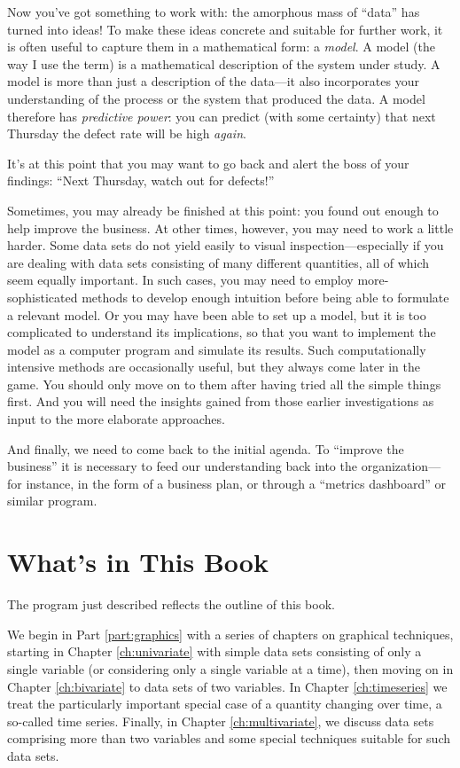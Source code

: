 Now you've got something to work with: the amorphous mass of ``data'' has
turned into ideas! To make these ideas concrete and suitable for
further work, it is often useful to capture them in a mathematical
form: a \emph{model}. A model (the way I use the term) is a
mathematical description of the system under study. A model is more
than just a description of the data---it also incorporates your
understanding of the process or the system that produced the data.  A
model therefore has \emph{predictive power}: you can predict (with
some certainty) that next Thursday the defect rate will be high
\emph{again}.

It's at this point that you may want to go back and alert the boss of
your findings: ``Next Thursday, watch out for defects!''

Sometimes, you may already be finished at this point: you found out
enough to help improve the business. At other times, however, you may
need to work a little harder. Some data sets do not yield easily to
visual inspection---especially if you are dealing with data sets
consisting of many different quantities, all of which seem equally
important. In such cases, you may need to employ more-sophisticated
methods to develop enough intuition before being able to formulate a
relevant model. Or you may have been able to set up a model, but it is
too complicated to understand its implications, so that you want to
implement the model as a computer program and simulate its results.
Such computationally intensive methods are occasionally useful, but
they always come later in the game. You should only move on to them
after having tried all the simple things first. And you will need the
insights gained from those earlier investigations as input to the more
elaborate approaches.

And finally, we need to come back to the initial agenda. To ``improve
the business'' it is necessary to feed our understanding back into the
organization---for instance, in the form of a business plan, or through
a ``metrics dashboard'' or similar program.

\section{What's in This Book}

The program just described reflects the outline of this book.

We begin in Part \ref{part:graphics} with a series of chapters on
graphical techniques, starting in Chapter \ref{ch:univariate} with
simple data sets consisting of only a single variable (or considering
only a single variable at a time), then moving on in Chapter
\ref{ch:bivariate} to data sets of two variables.  In Chapter
\ref{ch:timeseries} we treat the particularly important special case
of a quantity changing over time, a so-called time series.  Finally,
in Chapter \ref{ch:multivariate}, we discuss data sets comprising more
than two variables and some special techniques suitable for such data
sets.

